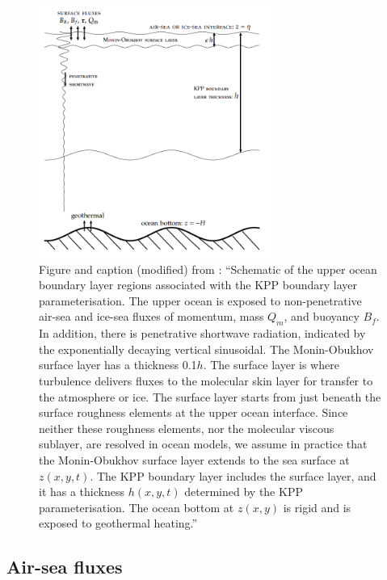 \begin{figure}[h!]
  \centering
  \includegraphics[width=3in]{figures/Figure81_CVmix_manual.png}
  \caption{Figure and caption (modified) from \cite{Griffies2015b}: ``Schematic of the upper ocean boundary layer regions associated with the KPP boundary layer parameterisation. The upper ocean is exposed to non-penetrative air-sea and ice-sea fluxes of momentum, mass $Q_m$, and buoyancy $B_f$. In addition, there is penetrative shortwave radiation, indicated by the exponentially decaying vertical sinusoidal. The Monin-Obukhov surface layer has a thickness 0.1$h$. The surface layer is where turbulence delivers fluxes to the molecular skin layer for transfer to the atmosphere or ice. The surface layer starts from just beneath the surface roughness elements at the upper ocean interface. Since neither these roughness elements, nor the molecular viscous sublayer, are resolved in ocean models, we assume in practice that the Monin-Obukhov surface layer extends to the sea surface at $z(x,y,t)$. The KPP boundary layer includes the surface layer, and it has a thickness $h(x,y,t)$ determined by the KPP parameterisation. The ocean bottom at $z(x,y)$ is rigid and is exposed to geothermal heating.''}%
\end{figure}

\subsection{Air-sea fluxes}

